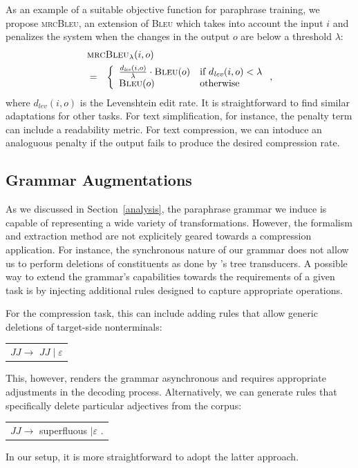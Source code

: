 \documentclass[11pt]{article}
\begin{document}
As an example of a suitable objective function for paraphrase
training, we propose \textsc{mrcBleu}, an extension of \textsc{Bleu}
which takes into account the input $i$ and penalizes the system when
the changes in the output $o$ are below a threshold $\lambda$:
\begin{eqnarray}
  \lefteqn{ \textsc{mrcBleu}_\lambda(i, o) } \nonumber\\
  &=& \left\{ \begin{array}{ll}
      \frac{d_{\mathit{lev}}(i, o)}{\lambda} \cdot \textsc{Bleu}(o) & \textrm{if
        $d_{\mathit{lev}}(i, o) <\lambda$} \nonumber \\ 
      \textsc{Bleu}(o) & \textrm{otherwise}
\end{array} \right. ,
\end{eqnarray}
where $d_{\mathit{lev}}(i, o)$ is the Levenshtein edit rate. It is
straightforward to find similar adaptations for other tasks. For text
simplification, for instance, the penalty term can include a
readability metric. For text compression, we can intoduce an
analoguous penalty if the output fails to produce the desired
compression rate.


\subsection{Grammar Augmentations} \label{injection}

As we discussed in Section~\ref{analysis}, the paraphrase grammar we
induce is capable of representing a wide variety of
transformations. However, the formalism and extraction method are not
explicitely geared towards a compression application. For instance,
the synchronous nature of our grammar does not allow us to perform
deletions of constituents as done by 's tree
transducers.  A possible way to extend the grammar's capabilities
towards the requirements of a given task is by injecting additional
rules designed to capture appropriate operations.

For the compression task, this can include adding rules that allow
generic deletions of target-side nonterminals:
\begin{center}
\begin{tabular}{c}
 $\mathit{JJ} \rightarrow$ $\mathit{JJ} \mid \varepsilon$ \\
\end{tabular}
\end{center}
This, however, renders the grammar asynchronous and requires
appropriate adjustments in the decoding process. Alternatively, we can
generate rules that specifically delete particular adjectives from the
corpus:
\begin{center}
\begin{tabular}{c}
 $\mathit{JJ} \rightarrow$ superfluous $\mid \varepsilon$ .\\
\end{tabular}
\end{center}
In our setup, it is more straightforward to adopt the latter approach.
\end{document}
